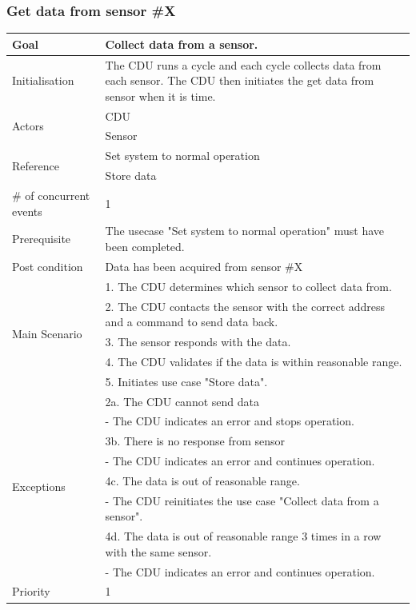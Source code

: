 \subsubsection{Get data from sensor \#X}
\begin{table}[H]
	\centering
	\begin{tabular}{|l|p{10cm}|}
	\hline
	Goal 							& Collect data from a sensor. \\ \hline
	Initialisation 					& The CDU runs a cycle and each cycle collects data from each sensor. The CDU then initiates the get data from sensor when it is time. \\ \hline
	\multirow{2}{*}{Actors} 		& CDU \\ 
									& Sensor \\ \hline
	\multirow{2}{*}{Reference}		& Set system to normal operation \\ 
									& Store data \\\hline
	\# of concurrent events 		& 1 \\ \hline
	Prerequisite  					& The usecase "Set system to normal operation" must have been completed. \\ \hline
	Post condition 					& Data has been acquired from sensor \#X \\ \hline
	\multirow{5}{*}{Main Scenario} 	& 1. The CDU determines which sensor to collect data from. \\
	& 2. The CDU contacts the sensor with the correct address and a command to send data back.\\
	& 3. The sensor responds with the data.\\ 
	& 4. The CDU validates if the data is within reasonable range. \\
	& 5. Initiates use case "Store data".\\ \hline
	\multirow{8}{*}{Exceptions} & 2a. The CDU cannot send data \\ 
								& - The CDU indicates an error and stops operation.\\											& 3b. There is no response from sensor\\
								& - The CDU indicates an error and continues operation. \\
								& 4c. The data is out of reasonable range.\\
								& - The CDU reinitiates the use case "Collect data from a sensor". \\ 
								& 4d. The data is out of reasonable range 3 times in a row with the same sensor. \\
								& - The CDU indicates an error and continues operation.\\ \hline
	Priority					& 1\\\hline
	\end{tabular}
\end{table}

